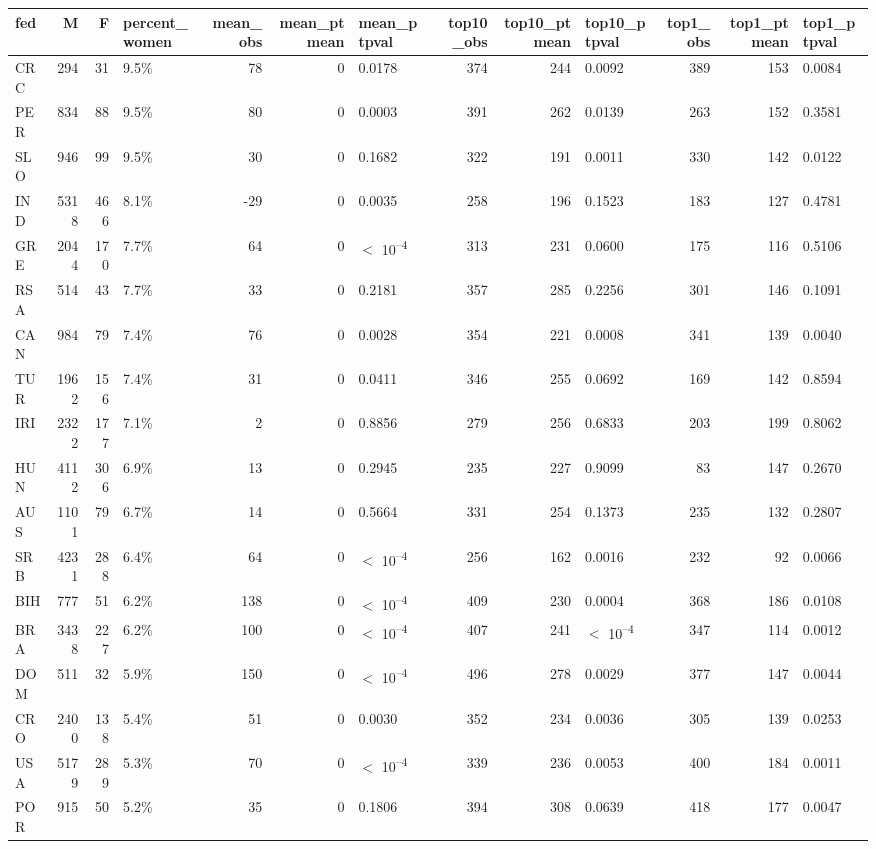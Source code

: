 
\begin{tabular}[t]{lrrlrrlrrlrrl}
\toprule
fed & M & F & percent_women & mean_obs & mean_ptmean & mean_ptpval & top10_obs & top10_ptmean & top10_ptpval & top1_obs & top1_ptmean & top1_ptpval\\
\midrule
CRC & 294 & 31 & 9.5\% & 78 & 0 & 0.0178 & 374 & 244 & 0.0092 & 389 & 153 & 0.0084\\
PER & 834 & 88 & 9.5\% & 80 & 0 & 0.0003 & 391 & 262 & 0.0139 & 263 & 152 & 0.3581\\
SLO & 946 & 99 & 9.5\% & 30 & 0 & 0.1682 & 322 & 191 & 0.0011 & 330 & 142 & 0.0122\\
IND & 5318 & 466 & 8.1\% & -29 & 0 & 0.0035 & 258 & 196 & 0.1523 & 183 & 127 & 0.4781\\
GRE & 2044 & 170 & 7.7\% & 64 & 0 & $<$ 10\textsuperscript{--4} & 313 & 231 & 0.0600 & 175 & 116 & 0.5106\\
RSA & 514 & 43 & 7.7\% & 33 & 0 & 0.2181 & 357 & 285 & 0.2256 & 301 & 146 & 0.1091\\
CAN & 984 & 79 & 7.4\% & 76 & 0 & 0.0028 & 354 & 221 & 0.0008 & 341 & 139 & 0.0040\\
TUR & 1962 & 156 & 7.4\% & 31 & 0 & 0.0411 & 346 & 255 & 0.0692 & 169 & 142 & 0.8594\\
IRI & 2322 & 177 & 7.1\% & 2 & 0 & 0.8856 & 279 & 256 & 0.6833 & 203 & 199 & 0.8062\\
HUN & 4112 & 306 & 6.9\% & 13 & 0 & 0.2945 & 235 & 227 & 0.9099 & 83 & 147 & 0.2670\\
AUS & 1101 & 79 & 6.7\% & 14 & 0 & 0.5664 & 331 & 254 & 0.1373 & 235 & 132 & 0.2807\\
SRB & 4231 & 288 & 6.4\% & 64 & 0 & $<$ 10\textsuperscript{--4} & 256 & 162 & 0.0016 & 232 & 92 & 0.0066\\
BIH & 777 & 51 & 6.2\% & 138 & 0 & $<$ 10\textsuperscript{--4} & 409 & 230 & 0.0004 & 368 & 186 & 0.0108\\
BRA & 3438 & 227 & 6.2\% & 100 & 0 & $<$ 10\textsuperscript{--4} & 407 & 241 & $<$ 10\textsuperscript{--4} & 347 & 114 & 0.0012\\
DOM & 511 & 32 & 5.9\% & 150 & 0 & $<$ 10\textsuperscript{--4} & 496 & 278 & 0.0029 & 377 & 147 & 0.0044\\
CRO & 2400 & 138 & 5.4\% & 51 & 0 & 0.0030 & 352 & 234 & 0.0036 & 305 & 139 & 0.0253\\
USA & 5179 & 289 & 5.3\% & 70 & 0 & $<$ 10\textsuperscript{--4} & 339 & 236 & 0.0053 & 400 & 184 & 0.0011\\
POR & 915 & 50 & 5.2\% & 35 & 0 & 0.1806 & 394 & 308 & 0.0639 & 418 & 177 & 0.0047\\

\end{tabular}
